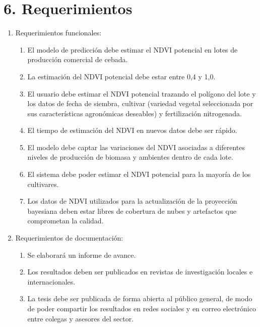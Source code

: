 \documentclass[
11pt, %
]{charter}
\begin{document}
\section{6. Requerimientos}
\label{sec:requerimientos}

\begin{enumerate}
    \item Requerimientos funcionales:
        \begin{enumerate}
            \item El modelo de predicción debe estimar el NDVI potencial en lotes de producción comercial de cebada.
            \item La estimación del NDVI potencial debe estar entre 0,4 y 1,0.
            \item El usuario debe estimar el NDVI potencial trazando el polígono del lote y los datos de fecha de siembra, cultivar (variedad vegetal seleccionada por sus características agronómicas deseables) y fertilización nitrogenada.
            \item El tiempo de estimación del NDVI en nuevos datos debe ser rápido.
            \item El modelo debe captar las variaciones del NDVI asociadas a diferentes niveles de producción de biomasa y ambientes dentro de cada lote.
            \item El sistema debe poder estimar el NDVI potencial para la mayoría de los cultivares.
            \item Los datos de NDVI utilizados para la actualización de la proyección bayesiana deben estar libres de cobertura de nubes y artefactos que comprometan la calidad.
        \end{enumerate}
    \item Requerimientos de documentación:
        \begin{enumerate}
            \item Se elaborará un informe de avance.
            \item Los resultados deben ser publicados en revistas de investigación locales e internacionales.
            \item La tesis debe ser publicada de forma abierta al público general, de modo de poder compartir los resultados en redes sociales y en correo electrónico entre colegas y asesores del sector.
        \end{enumerate}
\end{enumerate}


\pagebreak
\end{document}

